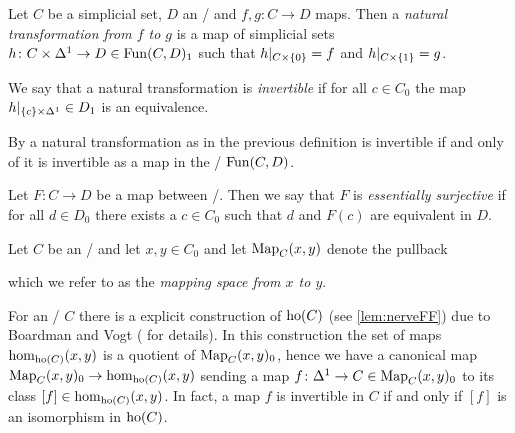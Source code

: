 \begin{definition}
    Let $C$ be a simplicial set, $D$ an \inftycat/ and $f,g\colon C\to D$ maps.
    Then a \emph{natural transformation from $f$ to $g$} is a map of simplicial sets $h\colon C\times\Delta^1\to D\in\operatorname{Fun}(C,D)_1$ such that $h|_{C\times\left\lbrace0\right\rbrace}=f$ and $h|_{C\times\left\lbrace1\right\rbrace}=g$.
    
    We say that a natural transformation is \emph{invertible} if for all $c\in C_0$ the map $h|_{\left\lbrace c\right\rbrace\times\Delta^1}\in D_1$ is an equivalence.
\end{definition}
\begin{remark}
    By \cite[Corollary 3.5.12]{cisinski_2019} a natural transformation as in the previous definition is invertible if and only of it is invertible as a map in the \inftycat/ $\operatorname{Fun}(C,D)$.
\end{remark}
\begin{definition}
    Let $F\colon C\to D$ be a map between \inftycats/.
    Then we say that $F$ is \emph{essentially surjective} if for all $d\in D_0$ there exists a $c\in C_0$ such that $d$ and $F(c)$ are equivalent in $D$.
\end{definition}
\begin{definition}\label{def:mappingSpace}
    Let $C$ be an \inftycat/ and let $x,y\in C_0$ and let $\operatorname{Map}_C(x,y)$ denote the pullback 
    \begin{center}
    \end{center}
    which we refer to as the \emph{mapping space from $x$ to $y$}.
\end{definition}
\begin{remark}\label{rmk:boardmanVogt}
    For an \inftycat/ $C$ there is a explicit construction of $\operatorname{ho}(C)$ (see \cref{lem:nerveFF}) due to Boardman and Vogt (\cite[Theorem 1.6.6]{cisinski_2019} for details).
    In this construction the set of maps $\hom_{\operatorname{ho}(C)}(x,y)$ is a quotient of $\operatorname{Map}_C(x,y)_0$, hence we have a canonical map $\operatorname{Map}_C(x,y)_0\to\hom_{\operatorname{ho}(C)}(x,y)$ sending a map $f\colon\Delta^1\to C\in\operatorname{Map}_C(x,y)_0$ to its class $[f]\in\hom_{\operatorname{ho}(C)}(x,y)$.
    In fact, a map $f$ is invertible in $C$ if and only if $[f]$ is an isomorphism in $\operatorname{ho}(C)$.
\end{remark}
